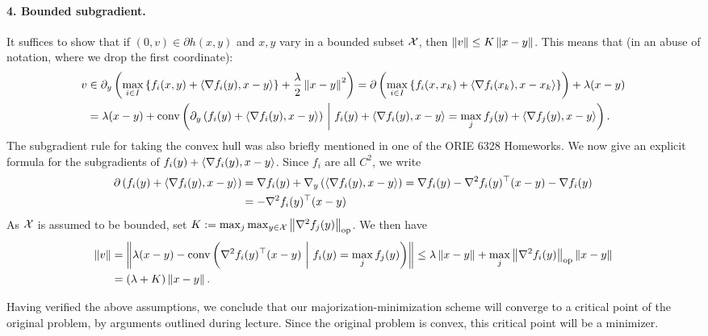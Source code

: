 \documentclass[10pt]{article}
\begin{document}
\begin{Answer}
    \paragraph{4. Bounded subgradient.}
    It suffices to show that if $(0, v) \in \partial h(x, y)$ and $x, y$ vary
    in a bounded subset $\mathcal{X}$, then $\left \| v \right \| \leq K \left \| x - y \right \|$. This
    means that (in an abuse of notation, where we drop the first coordinate):
    \begin{align*}
        v & \in \partial_y \left(\max_{i \in I} \left\{   f_i(x, y) + \left\langle \nabla
        f_i(y),x - y \right\rangle  \right\} + \frac{\lambda}{2} \left \| x - y \right \|^2 \right)
        = \partial \left(
        \max_{i \in I} \left\{   f_i(x, x_k) + \left\langle \nabla
            f_i(x_k),x - x_k \right\rangle  \right\}
        \right) + \lambda (x - y) \\
        &= \lambda (x - y) + \mathrm{conv}\left(
            \partial_y \left( f_i (y) + \left\langle \nabla f_i(y), x - y \right\rangle \right)
            \ \middle| \  f_i(y) + \left\langle \nabla f_i(y), x - y \right\rangle = \max_j
                f_j(y) + \left\langle \nabla f_j(y), x - y \right\rangle\right).
    \end{align*}
    The subgradient rule for taking the convex hull was also briefly mentioned
    in one of the ORIE 6328 Homeworks. We now give an explicit formula for the
    subgradients of $f_i(y) + \left\langle \nabla f_i(y), x - y \right\rangle$. Since $f_i$ are all
    $C^2$, we write
    \begin{align*}
        \partial \left( f_i(y) + \left\langle \nabla f_i(y), x - y \right\rangle \right) &=
        \nabla f_i(y) + \nabla_y \left( \left\langle \nabla f_i(y), x - y \right\rangle \right)
        = \nabla f_i(y) - \nabla^2 f_i(y)^\top (x - y) - \nabla f_i(y) \\
        &= -\nabla^2 f_i(y)^\top (x - y)
    \end{align*}
    As $\mathcal{X}$ is assumed to be bounded, set $K := \max_j \max_{y \in \mathcal{X}}
    \left \|  \nabla^2 f_j(y)  \right \|_{\mathrm{op}}$. We then have
    \begin{align*}
        \left \| v \right \| &= \left \| \lambda(x - y) - \mathrm{conv}
        \left( \nabla^2 f_i(y)^\top (x - y) \ \middle| \  f_i(y) = \max_j f_j(y)
        \right) \right \|
        \leq \lambda \left \| x - y \right \| + \max_j \left \|  \nabla^2 f_i(y)  \right \|_{\mathrm{op}}
        \left \| x - y \right \| \\
        &= \left( \lambda + K \right)\left \| x - y \right \|.
    \end{align*}

    Having verified the above assumptions, we conclude that our
    majorization-minimization scheme will converge to a critical point of the
    original problem, by arguments outlined during lecture. Since the original
    problem is convex, this critical point will be a minimizer.
\end{Answer}
\end{document}
